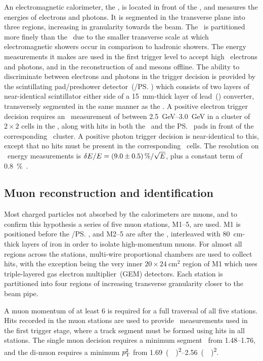 An electromagnetic calorimeter, the \ecal, is located in front of the \hcal, 
and measures the energies of electrons and photons.
It is segmented in the transverse plane into three regions, increasing in 
granularity towards the beam.
The \ecal\ is partitioned more finely than the \hcal\ due to the smaller 
transverse scale at which electromagnetic showers occur in comparison to 
hadronic showers.
The energy measurements it makes are used in the first trigger level to accept 
high \ET\ electrons and photons, and in the reconstruction of \Ppizero and 
\Peta mesons offline.
The ability to discriminate between electrons and photons in the trigger 
decision is provided by the scintillating pad/preshower detector~(\spd/\ps) 
which consists of two layers of near-identical scintillator either side of a 
\SI{15}{\milli\metre}-thick layer of lead~() converter, transversely 
segmented in the same manner as the \ecal.
A positive electron trigger decision requires an \ET\ measurement of between 
\SIrange{2.5}{3.0}{\GeV} in a cluster of $2\times2$ cells in the \ecal, along 
with hits in both the \spd\ and the \ps\ pads in front of the corresponding 
\ecal\ cluster.  A positive photon trigger decision is near-identical to this, 
except that no hits must be present in the corresponding \spd\ cells.
The resolution on \ecal\ energy measurements is $\unc{E}/E = \SI{9 \pm 
  0.5}{\percent}/\sqrt{E}$, plus a constant term of 
\SI{0.8}{\percent}~\cite{Perret:2015pla}.

\subsection{Muon reconstruction and identification}
\label{chap:intro:lhcb:muon}

Most charged particles not absorbed by the calorimeters are muons, and to 
confirm this hypothesis a series of five muon stations, M1--5, are used.
M1 is positioned before the \spd/\ps, and M2--5 are after the \hcal, 
interleaved with \SI{80}{\centi\metre}-thick layers of iron in order to isolate 
high-momentum muons.
For almost all regions across the stations, multi-wire proportional chambers 
are used to collect hits, with the exception being the very inner 
$20\times\SI{24}{\centi\metre\squared}$ region of M1 which uses triple-layered 
gas electron multiplier~(GEM) detectors.
Each station is partitioned into four regions of increasing transverse 
granularity closer to the beam pipe.

A muon momentum of at least \SI{6}{\GeVc} is required for a full traversal of 
all five stations.
Hits recorded in the muon stations are used to provide \pT\ measurements used 
in the first trigger stage, where a track segment must be formed using hits in 
all stations.
The single muon decision requires a minimum segment \pT\ from 
\SIrange{1.48}{1.76}{\GeVc}, and the di-muon requires a minimum $\pT^{2}$ from 
\SIrange{1.69}{2.56}{(\GeVc)\squared}.

